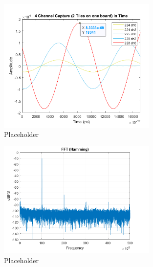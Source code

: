 \begin{figure}[H]
	\centering
	\includegraphics[width = 0.7\textwidth]{chap/05-characterization/img/plot1.png}
	\caption{Placeholder}
	\label{fig:plot1}
\end{figure}
\begin{figure}[H]
	\centering
	\includegraphics[width = 0.7\textwidth]{chap/05-characterization/img/plot2.png}
	\caption{Placeholder}
	\label{fig:plot2}
\end{figure}


